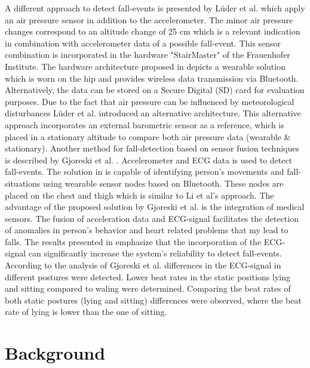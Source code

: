 \documentclass[review]{elsarticle}
\begin{document}
A different approach to detect fall-events is presented by Lüder et al. \cite{Luder2009} which apply an air pressure sensor in addition to the accelerometer. The minor air pressure changes correspond to an altitude change of 25 cm which is a relevant indication in combination with accelerometer data of a possible fall-event.  This sensor combination is incorporated in the hardware "StairMaster" of the Frauenhofer Institute. The hardware architecture proposed in \cite{Luder2009} depicts a wearable solution which is worn on the hip and provides wireless data transmission via Bluetooth. Alternatively, the data can be stored on a Secure Digital (SD) card for evaluation purposes. Due to the fact that air pressure can be influenced by meteorological disturbances Lüder et al. \cite{Luder2009} introduced an alternative architecture. This alternative approach incorporates an external barometric sensor as a reference, which is placed in a stationary altitude to compare both air pressure data (wearable \& stationary). Another method for fall-detection based on sensor fusion techniques is described by Gjoreski et al. \cite{Gjoreski2014}. Accelerometer and ECG data is used to detect fall-events. The solution in \cite{Gjoreski2014} is capable of identifying person's movements and fall-situations using wearable sensor nodes based on Bluetooth. These nodes are placed on the chest and thigh which is similar to Li et al's \cite{Li2009} approach. The advantage of the proposed solution by Gjoreski et al. \cite{Gjoreski2014} is the integration of medical sensors. The fusion of acceleration data and ECG-signal facilitates the detection of anomalies in person's behavior and heart related problems that my lead to falls. The results presented in \cite{Gjoreski2014} emphasize that the incorporation of the ECG-signal can significantly increase the system's reliability to detect fall-events. According to the analysis of Gjoreski et al. \cite{Gjoreski2014} differences in the ECG-signal in different postures were detected. Lower beat rates in the static positions lying and sitting compared to waling were determined. Comparing the beat rates of both static postures (lying and sitting) differences were observed, where the beat rate of lying is lower than the one of sitting.



\section{Background}
\label{sec:background}
\end{document}
